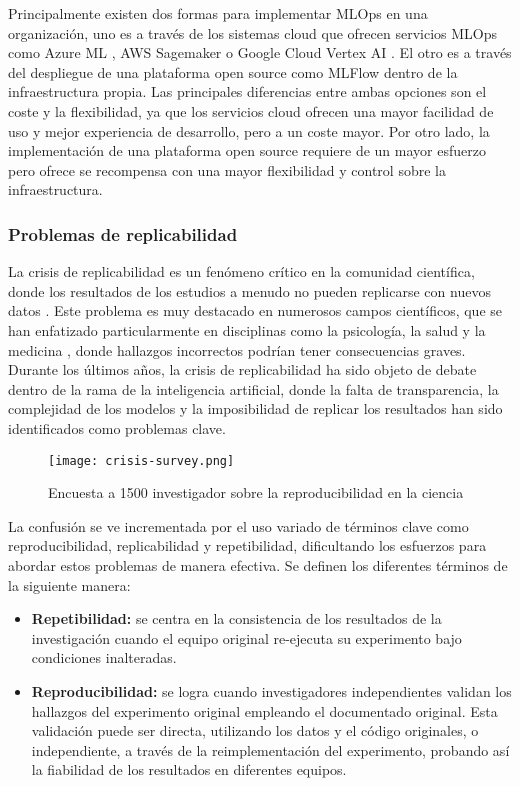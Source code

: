 Principalmente existen dos formas para implementar MLOps en una organización, uno es
a través de los sistemas cloud que ofrecen servicios MLOps como Azure ML \cite{microsoft2023azureml}, 
AWS Sagemaker \cite{aws_sagemaker} o Google Cloud Vertex AI \cite{google2023vertexai}. El otro es a través del despliegue de una plataforma open source
como MLFlow dentro de la infraestructura propia. Las principales diferencias entre ambas
opciones son el coste y la flexibilidad, ya que los servicios cloud ofrecen una mayor
facilidad de uso y mejor experiencia de desarrollo, pero a un coste mayor. Por otro lado,
la implementación de una plataforma open source requiere de un mayor esfuerzo pero ofrece
se recompensa con una mayor flexibilidad y control sobre la infraestructura.

\subsubsection{Problemas de replicabilidad}
La crisis de replicabilidad es un fenómeno crítico en la comunidad científica,  
donde los resultados de los estudios a menudo no pueden replicarse con nuevos datos \cite{puetz2024replication}.
Este problema es muy destacado en numerosos campos científicos, que se han enfatizado particularmente 
en disciplinas como la psicología, la salud y la medicina \cite{puetz2024replication}\cite{Baker_2016}, donde hallazgos incorrectos 
podrían tener consecuencias graves. Durante los últimos años, la crisis de replicabilidad ha
sido objeto de debate dentro de la rama de la inteligencia artificial, donde la falta de
transparencia, la complejidad de los modelos y la imposibilidad de replicar los resultados
han sido identificados como problemas clave.

\begin{figure}[ht]
    \centering
    \texttt{[image: crisis-survey.png]}
    \caption{Encuesta a 1500 investigador sobre la reproducibilidad en la ciencia \cite{Baker_2016}}\label{fig:crisis-survey}
\end{figure}

La confusión se ve incrementada por el uso variado de términos clave como reproducibilidad, 
replicabilidad y repetibilidad, \cite{readytensor} dificultando los esfuerzos para abordar estos problemas de 
manera efectiva. Se definen los diferentes términos de la siguiente manera:
\begin{itemize}
    \item \textbf{Repetibilidad:} se centra en la consistencia de los resultados de la investigación cuando el equipo 
    original re-ejecuta su experimento bajo condiciones inalteradas. 
    \item \textbf {Reproducibilidad:} se logra cuando investigadores independientes validan los hallazgos del 
    experimento original empleando el documentado original. Esta validación puede ser directa, utilizando 
    los datos y el código originales, o independiente, a través de la reimplementación del experimento, 
    probando así la fiabilidad de los resultados en diferentes equipos.
\end{itemize}

